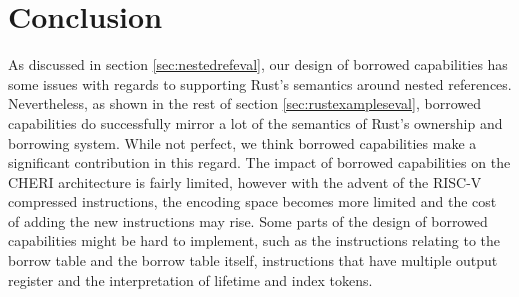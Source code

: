 \section{Conclusion}
As discussed in section \ref{sec:nestedrefeval}, our design of borrowed capabilities has some issues with regards to supporting Rust's semantics around nested references.
Nevertheless, as shown in the rest of section \ref{sec:rustexampleseval}, borrowed capabilities do successfully mirror a lot of the semantics of Rust's ownership and borrowing system.
While not perfect, we think borrowed capabilities make a significant contribution in this regard.
The impact of borrowed capabilities on the CHERI architecture is fairly limited, however with the advent of the RISC-V compressed instructions, the encoding space becomes more limited and the cost of adding the new instructions may rise.
Some parts of the design of borrowed capabilities might be hard to implement, such as the instructions relating to the borrow table and the borrow table itself, instructions that have multiple output register and the interpretation of lifetime and index tokens.
